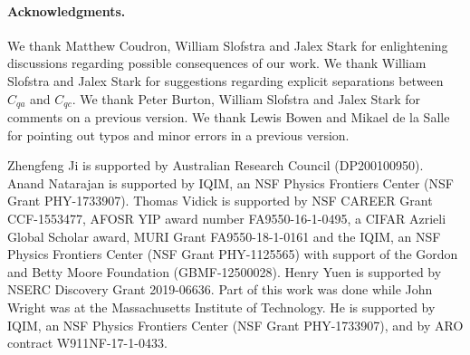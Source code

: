 \paragraph{Acknowledgments.} We thank Matthew Coudron, William Slofstra and Jalex Stark for enlightening discussions regarding possible consequences of our work. We thank William Slofstra and Jalex Stark for suggestions regarding explicit separations between $C_{qa}$ and $C_{qc}$. We thank Peter Burton, William Slofstra and Jalex Stark for comments on a previous version. We thank Lewis Bowen and Mikael de la Salle for pointing out typos and minor errors in a previous version.

Zhengfeng Ji is supported by Australian Research Council (DP200100950). Anand Natarajan is supported by IQIM, an NSF Physics Frontiers Center (NSF Grant PHY-1733907). Thomas Vidick is supported by NSF CAREER Grant CCF-1553477, AFOSR YIP award number FA9550-16-1-0495, a CIFAR Azrieli Global Scholar award, MURI Grant FA9550-18-1-0161 and the IQIM, an NSF Physics Frontiers Center (NSF Grant PHY-1125565) with support of the Gordon and Betty Moore Foundation (GBMF-12500028). Henry Yuen is supported by NSERC Discovery Grant 2019-06636.
Part of this work was done while John Wright was at the Massachusetts Institute of Technology.
He is supported by IQIM, an NSF Physics Frontiers Center (NSF Grant PHY-1733907), and by ARO contract W911NF-17-1-0433.



 
